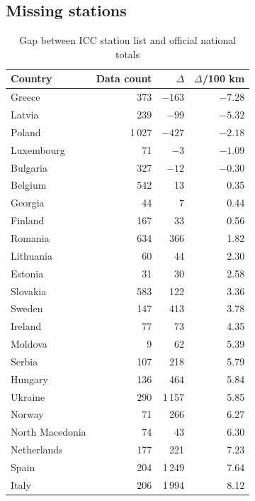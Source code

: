 \begin{appendices}
\section{Missing stations}
\label{app:missing}
\begin{table}[!htbp]
  \centering
  \caption{Gap between ICC station list and official national totals}
  \begin{tabular}{@{}lrrr@{}}
    \toprule
    Country & Data count & $\Delta$\tnote{*} & $\Delta$/100 km \\
    \midrule
    Greece             &   373 &   $-163$ &  $-7.28$ \\
    Latvia             &   239 &    $-99$ &  $-5.32$ \\
    Poland    & 1\,027 &   $-427$ &  $-2.18$ \\
    Luxembourg         &    71 &     $-3$ &  $-1.09$ \\
    Bulgaria  &   327 &    $-12$ &  $-0.30$ \\
    Belgium            &   542 &     13 &   0.35 \\
    Georgia            &    44 &      7 &   0.44 \\
    Finland            &   167 &     33 &   0.56 \\
    Romania   &   634 &    366 &   1.82 \\
    Lithuania          &    60 &     44 &   2.30 \\
    Estonia            &    31 &     30 &   2.58 \\
    Slovakia           &   583 &    122 &   3.36 \\
    Sweden             &   147 &    413 &   3.78 \\
    Ireland            &    77 &     73 &   4.35 \\
    Moldova            &     9 &     62 &   5.39 \\
    Serbia    &   107 &    218 &   5.79 \\
    Hungary            &   136 &    464 &   5.84 \\
    Ukraine            &   290 &  1\,157 &   5.85 \\
    Norway             &    71 &    266 &   6.27 \\
    North Macedonia    &    74 &     43 &   6.30 \\
    Netherlands        &   177 &    221 &   7.23 \\
    Spain              &   204 &  1\,249 &   7.64 \\
    Italy              &   206 &  1\,994 &   8.12 \\

\end{tabular}
\end{table}
\end{appendices}
